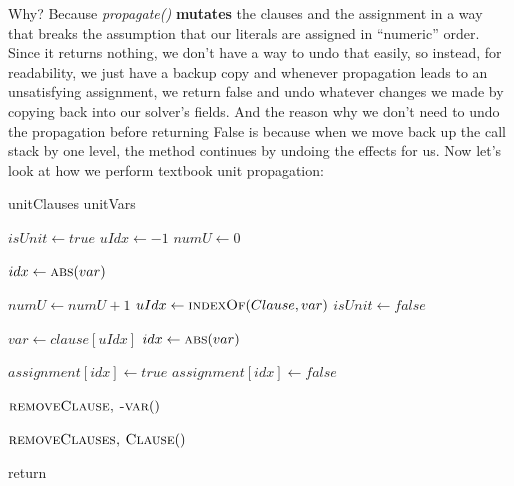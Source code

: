 Why? Because \textit{propagate()} \textbf{mutates} the clauses and the assignment in a way 
that breaks the assumption that our literals are assigned in ``numeric'' order. Since it 
returns nothing, we don't have a way to undo that easily, so instead, for readability, 
we just have a backup copy and whenever propagation leads to an unsatisfying assignment, 
we return false and undo whatever changes we made by copying back into our solver's fields.
And the reason why we don't need to undo the propagation before returning False is because 
when we move back up the call stack by one level, the method continues by undoing the effects for us.
Now let's look at how we perform textbook unit propagation:

\begin{algorithm}[H]
\caption{Textbook Unit Propagation}\label{alg:11}
\begin{algorithmic}[1]


    \State unitClauses 
    \State unitVars 

        \State $isUnit \gets true$
        \State $uIdx \gets -1$
        \State $numU \gets 0$

            \State $idx \gets \Call{abs}{var}$

                \State $numU \gets numU + 1$
                \State $uIdx \gets \Call{indexOf}{Clause, var}$
                \State $isUnit \gets false$
            \EndIf
        \EndFor

            \State {}
            \State {}

            \State $var \gets clause[uIdx]$
            \State $idx \gets \Call{abs}{var}$

                \State $assignment[idx] \gets true$
            \Else 
                \State $assignment[idx] \gets false$
            \EndIf
        \EndIf
    \EndFor

                \State $\Call{remove{Clause, -var}}$
            \EndIf

                \State $\Call{remove{Clauses, Clause}}$
            \EndIf
        \EndFor
    \EndFor

        return
    \EndIf
\EndWhile

\EndProcedure
\end{algorithmic}
\end{algorithm}

